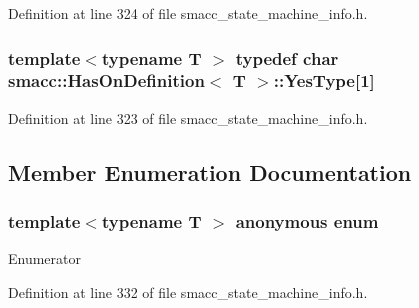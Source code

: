 Definition at line 324 of file smacc\+\_\+state\+\_\+machine\+\_\+info.\+h.

\subsubsection[{\texorpdfstring{Yes\+Type}{YesType}}]{\setlength{\rightskip}{0pt plus 5cm}template$<$typename T $>$ typedef char {\bf smacc\+::\+Has\+On\+Definition}$<$ T $>$\+::Yes\+Type\mbox{[}1\mbox{]}\hspace{0.3cm}{\ttfamily [private]}}\hypertarget{classsmacc_1_1HasOnDefinition_af147416543b9d5a19d3dfc4f3f0d42a6}{}\label{classsmacc_1_1HasOnDefinition_af147416543b9d5a19d3dfc4f3f0d42a6}


Definition at line 323 of file smacc\+\_\+state\+\_\+machine\+\_\+info.\+h.



\subsection{Member Enumeration Documentation}
\subsubsection[{\texorpdfstring{anonymous enum}{anonymous enum}}]{\setlength{\rightskip}{0pt plus 5cm}template$<$typename T $>$ anonymous enum}\hypertarget{classsmacc_1_1HasOnDefinition_a42ed2a75557706765cc75f0454d612db}{}\label{classsmacc_1_1HasOnDefinition_a42ed2a75557706765cc75f0454d612db}
\begin{Desc}
\item[Enumerator]\par
\begin{description}
\item[{\em 
value\hypertarget{classsmacc_1_1HasOnDefinition_a42ed2a75557706765cc75f0454d612dba0ee3bd0e07973c128ab64f02600c7720}{}\label{classsmacc_1_1HasOnDefinition_a42ed2a75557706765cc75f0454d612dba0ee3bd0e07973c128ab64f02600c7720}
}]\end{description}
\end{Desc}


Definition at line 332 of file smacc\+\_\+state\+\_\+machine\+\_\+info.\+h.


